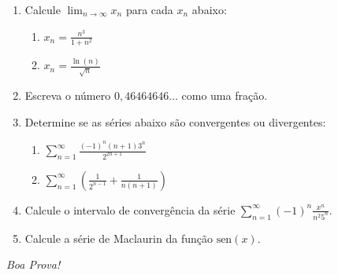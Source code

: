 \documentclass[a4paper,5pt]{amsbook}
\newcommand{\sen}{\text{sen}}
\newcommand{\ds}{\displaystyle}
\begin{document}
\vspace{0.2cm}
\begin{enumerate}

\item Calcule $\ds\lim_{n\rightarrow\infty} x_n$ para cada $x_n$ abaixo:
	\begin{enumerate}
		\vspace{0.2cm}
		\item $x_n = \ds\frac{n^3}{1+n^2}$
		\vspace{0.2cm}
		\item $x_n = \ds\frac{\ln(n)}{\sqrt{n}}$
	\end{enumerate}
\vspace{0.5cm}

\item Escreva o n\'umero $0,46464646\ldots$ como uma fra\c{c}\~ao.
\vspace{0.5cm}

\item Determine se as s\'eries abaixo s\~ao convergentes ou divergentes:
	\begin{enumerate}
		\vspace{0.2cm}
		\item $\ds\sum_{n=1}^\infty \frac{(-1)^n(n+1)3^n}{2^{2n+1}}$
		\vspace{0.2cm}
		\item $\ds\sum_{n=1}^\infty \left(\frac{1}{2^{n-1}} + \frac{1}{n(n+1)}\right)$
	\end{enumerate}
\vspace{0.5cm}

\item Calcule o intervalo de converg\^encia da s\'erie $\ds\sum_{n=1}^\infty (-1)^n\frac{x^n}{n^2 5^n}$.
\vspace{0.5cm}

\item Calcule a s\'erie de Maclaurin da fun\c{c}\~ao $\sen(x)$.

\end{enumerate}

\begin{flushright}
	\vspace{0.5cm}
	\textit{Boa Prova!}
\end{flushright}
\end{document}
